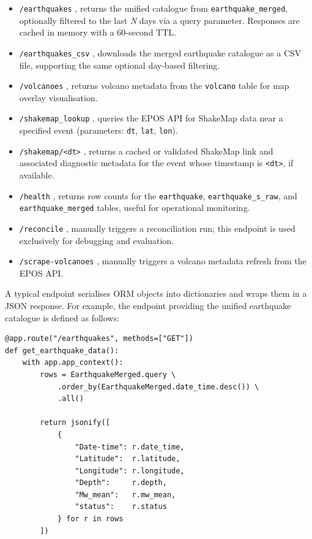 \documentclass[12pt]{article}
\begin{document}
\begin{itemize}
    \item \texttt{/earthquakes} ,  returns the unified catalogue from \texttt{earthquake\_merged}, optionally filtered to the last \emph{N} days via a query parameter. Responses are cached in memory with a 60-second TTL.
    \item \texttt{/earthquakes\_csv} ,  downloads the merged earthquake catalogue as a CSV file, supporting the same optional day-based filtering.
    \item \texttt{/volcanoes} ,  returns volcano metadata from the \texttt{volcano} table for map overlay visualisation.
    \item \texttt{/shakemap\_lookup} ,  queries the EPOS API for ShakeMap data near a specified event (parameters: \texttt{dt}, \texttt{lat}, \texttt{lon}).
    \item \texttt{/shakemap/<dt>} ,  returns a cached or validated ShakeMap link and associated diagnostic metadata for the event whose timestamp is \texttt{<dt>}, if available.
    \item \texttt{/health} ,  returns row counts for the \texttt{earthquake}, \texttt{earthquake\_s\_raw}, and \texttt{earthquake\_merged} tables, useful for operational monitoring.
    \item \texttt{/reconcile} ,  manually triggers a reconciliation run; this endpoint is used exclusively for debugging and evaluation.
    \item \texttt{/scrape-volcanoes} ,  manually triggers a volcano metadata refresh from the EPOS API.
\end{itemize}

A typical endpoint serialises ORM objects into dictionaries and wraps them in a JSON response. For example, the endpoint providing the unified earthquake catalogue is defined as follows:

\begin{verbatim}
@app.route("/earthquakes", methods=["GET"])
def get_earthquake_data():
    with app.app_context():
        rows = EarthquakeMerged.query \
            .order_by(EarthquakeMerged.date_time.desc()) \
            .all()

        return jsonify([
            {
                "Date-time": r.date_time,
                "Latitude":  r.latitude,
                "Longitude": r.longitude,
                "Depth":     r.depth,
                "Mw_mean":   r.mw_mean,
                "status":    r.status
            } for r in rows
        ])
\end{verbatim}
\end{document}
